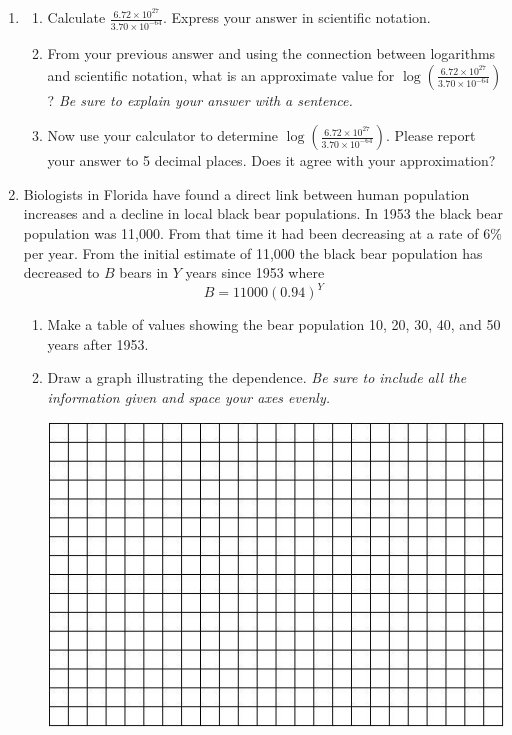 \documentclass[12pt]{article}
\begin{document}
\newpage
\begin{enumerate}
\item \begin{enumerate}
\item Calculate $\displaystyle \frac{6.72 \times 10^{27}}{3.70 \times 10^{-64}} $. Express your answer in scientific notation.
\vfill
\item From your previous answer and using the connection between logarithms and scientific notation, what is an approximate value for $\displaystyle \log \left( \frac{6.72 \times 10^{27}}{3.70 \times 10^{-64}} \right)$?  \emph{Be sure to explain your answer with a sentence.}
\vfill
\item Now use your calculator to determine  $\displaystyle \log \left(\frac{6.72 \times 10^{27}}{3.70 \times 10^{-64}}  \right)$. Please report your answer to 5 decimal places.  Does it agree with your approximation?
\vfill
\end{enumerate}
\newpage

\item Biologists in Florida have found a direct link between human population increases and a decline in local black bear populations.  In 1953 the black bear population was 11,000.  From that time it had been decreasing at a rate of 6\% per year.  From the initial estimate of 11,000 the black bear population has decreased to $B$ bears in $Y$ years since 1953 where $$B=11000(0.94)^Y$$

\begin{enumerate}
\item Make a table of values showing the bear population 10, 20, 30, 40, and 50 years after 1953.  
\vfill
\item Draw a graph illustrating the dependence.  \emph{Be sure to include all the information given and space your axes evenly.}

\vspace{.1in}
\begin{center}
 {\includegraphics [width = 6in] {../GraphPaper}}
\end{center}
\vspace{.1in}


\end{enumerate}
\end{enumerate}
\end{document}
